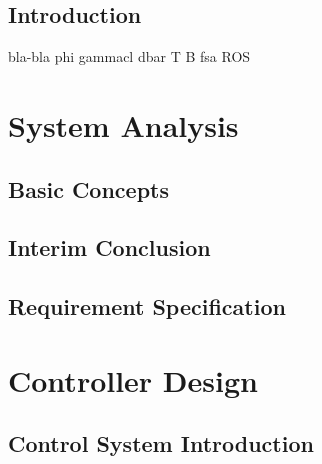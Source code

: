 
\graphicspath{{figures/}}


	






\setcounter{page}{1}
\renewcommand{\thepage}{\Roman{page}}




\setlength\parskip{0ex}
\tableofcontents
\setlength\parskip{1ex}



\printnomenclature \label{chap:acronym}

\printglossary[type=symbols,style=long4col]



\cleardoublepage
\setcounter{page}{1}
\renewcommand{\thepage}{\arabic{page}}

\chapter{Introduction}\label{chap:intro}


bla-bla \gls{phi} \gls{gammacl}  \gls{dbar} \gls{T} \gls{B}
fsa
\gls{ROS}
\part{System Analysis}\label{part:part1}

\chapter{Basic Concepts}\label{basic_stuff}

\chapter{Interim Conclusion} \label{chap:interim_con}


\chapter{Requirement Specification}\label{chap:reqspec}


\part{Controller Design}\label{part:part2}
\chapter{Control System Introduction}\label{chap:systemdesign}

